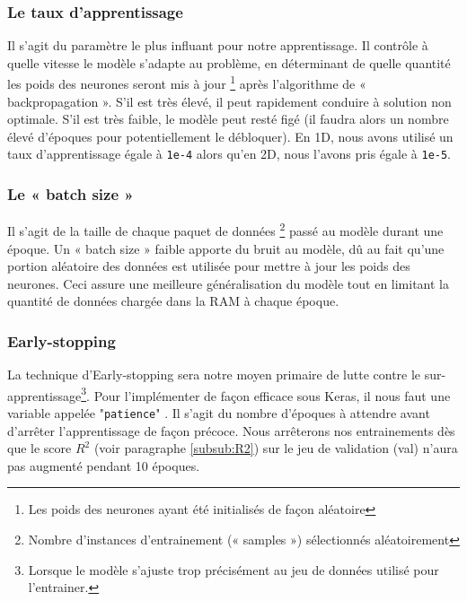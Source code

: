 \subsubsection{Le taux d'apprentissage}
Il s'agit du paramètre le plus influant pour notre apprentissage. Il contrôle à quelle vitesse le modèle s'adapte au problème, en déterminant de quelle quantité les poids des neurones seront mis à jour \footnote{Les poids des neurones ayant été initialisés de façon aléatoire} après l'algorithme de « backpropagation ». S'il est très élevé, il peut rapidement conduire à solution non optimale. S'il est très faible, le modèle peut resté figé (il faudra alors un nombre élevé d'époques pour potentiellement le débloquer). En 1D, nous avons utilisé un taux d'apprentissage égale à \verb|1e-4| alors qu'en 2D, nous l'avons pris égale à \verb|1e-5|.

\subsubsection{Le « batch size »}
Il s'agit de la taille de chaque paquet de données \footnote{Nombre d'instances d'entrainement (« samples ») sélectionnés aléatoirement} passé au modèle durant une époque. Un « batch size » faible apporte du bruit au modèle, dû au fait qu'une portion aléatoire des données est utilisée pour mettre à jour les poids des neurones. Ceci assure une meilleure généralisation du modèle tout en limitant la quantité de données chargée dans la RAM à chaque époque.

% 
% 

\subsubsection{Early-stopping}
La technique d'Early-stopping sera notre moyen primaire de lutte contre le sur-apprentissage\footnote{Lorsque le modèle s'ajuste trop précisément au jeu de données utilisé pour l'entrainer.}. Pour l'implémenter de façon efficace sous Keras, il nous faut une variable appelée "\verb|patience|" . Il s'agit du nombre d'époques à attendre avant d'arrêter l'apprentissage de façon précoce. Nous arrêterons nos entrainements dès que le score $R^2$ (voir paragraphe \ref{subsub:R2}) sur le jeu de validation (val) n'aura pas augmenté pendant 10 époques. 

